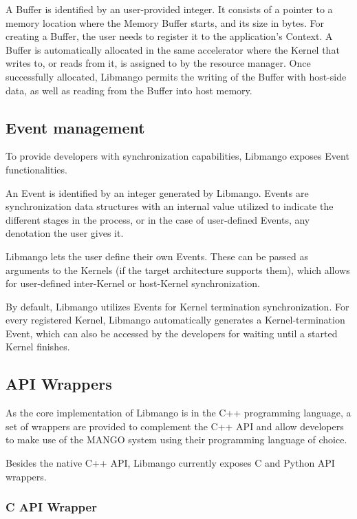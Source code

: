 A Buffer is identified by an user-provided integer. It consists of a pointer to a memory location where the Memory Buffer starts, and its size in bytes. 
For creating a Buffer, the user needs to register it to the application's Context. A Buffer is automatically allocated in the same accelerator where the Kernel that writes to, or reads from it, is assigned to by the resource manager.
Once successfully allocated, Libmango permits the writing of the Buffer with host-side data, as well as reading from the Buffer into host memory.


\subsection{Event management}
To provide developers with synchronization capabilities, Libmango exposes Event functionalities.

An Event is identified by an integer generated by Libmango. Events are synchronization data structures with an internal value utilized to indicate the different stages in the process, or in the case of user-defined Events, any denotation the user gives it.

Libmango lets the user define their own Events. These can be passed as arguments to the Kernels (if the target architecture supports them), which allows for user-defined inter-Kernel or host-Kernel synchronization.

By default, Libmango utilizes Events for Kernel termination synchronization. For every registered Kernel, Libmango automatically generates a Kernel-termination Event, which can also be accessed by the developers for waiting until a started Kernel finishes.

\subsection{API Wrappers}
As the core implementation of Libmango is in the C++ programming language, a set of wrappers are provided to complement the C++ API and allow developers to make use of the MANGO system using their programming language of choice.

Besides the native C++ API, Libmango currently exposes C and Python API wrappers.

\subsubsection{C API Wrapper}

